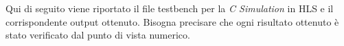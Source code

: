 Qui di seguito viene riportato il file testbench per la \textit{C Simulation} in HLS e il corrispondente output ottenuto. Bisogna precisare che ogni risultato ottenuto è stato verificato dal punto di vista numerico.


